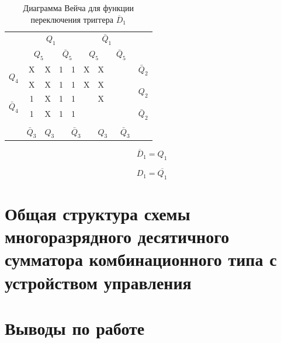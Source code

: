 \documentclass[a4paper,14pt]{article}
\begin{document}
\begin{table}[H]
	\begin{center}
		\caption{\label{tab:unD1_tab} Диаграмма Вейча для функции переключения триггера $\overline{D}_1$ }
	\begin{tabular}{cccccccccc}
		& \multicolumn{4}{c}{$Q_1$} & \multicolumn{4}{c}{$\bar{Q}_1$} &  \\
		& \multicolumn{2}{c}{$Q_5$} & \multicolumn{2}{c}{$\bar{Q}_5$} & \multicolumn{2}{c}{$Q_5$} & \multicolumn{2}{c}{$\bar{Q}_5$} &  \\ \cline{2-9}
		\multicolumn{1}{c|}{\multirow{2}{*}{$Q_4$}} & \multicolumn{1}{c|}{X} & \multicolumn{1}{c|}{X} & \multicolumn{1}{c|}{1} & \multicolumn{1}{c|}{1} & \multicolumn{1}{c|}{X} & \multicolumn{1}{c|}{X} & \multicolumn{1}{c|}{} & \multicolumn{1}{c|}{} & $\bar{Q}_2$ \\ \cline{2-9}
		\multicolumn{1}{c|}{} & \multicolumn{1}{c|}{X} & \multicolumn{1}{c|}{X} & \multicolumn{1}{c|}{1} & \multicolumn{1}{c|}{1} & \multicolumn{1}{c|}{X} & \multicolumn{1}{c|}{X} & \multicolumn{1}{c|}{} & \multicolumn{1}{c|}{} & \multirow{2}{*}{$Q_2$} \\ \cline{2-9}
		\multicolumn{1}{c|}{\multirow{2}{*}{$\bar{Q}_4$}} & \multicolumn{1}{c|}{1} & \multicolumn{1}{c|}{X} & \multicolumn{1}{c|}{1} & \multicolumn{1}{c|}{1} & \multicolumn{1}{c|}{} & \multicolumn{1}{c|}{X} & \multicolumn{1}{c|}{} & \multicolumn{1}{c|}{} &  \\ \cline{2-9}
		\multicolumn{1}{c|}{} & \multicolumn{1}{c|}{1} & \multicolumn{1}{c|}{X} & \multicolumn{1}{c|}{1} & \multicolumn{1}{c|}{1} & \multicolumn{1}{c|}{} & \multicolumn{1}{c|}{} & \multicolumn{1}{c|}{} & \multicolumn{1}{c|}{} & $\bar{Q}_2$ \\ \cline{2-9}
		&  & \multicolumn{2}{c}{} & \multicolumn{2}{c}{} & \multicolumn{2}{c}{} &  &  \\
		\multicolumn{1}{l}{} & \multicolumn{1}{l}{$\bar{Q}_3$} & \multicolumn{2}{l}{$Q_3$} & \multicolumn{2}{l}{$\bar{Q}_3$} & \multicolumn{2}{l}{$Q_3$} & \multicolumn{1}{l}{$\bar{Q}_3$} & \multicolumn{1}{l}{}
	\end{tabular}
	\end{center}
\end{table}

$$\overline{D}_1 = Q_1$$

$$D_1 = \overline{Q_1}$$

\section{Общая структура схемы многоразрядного десятичного сумматора комбинационного типа с устройством управления}

\section{Выводы по работе}
\end{document}
